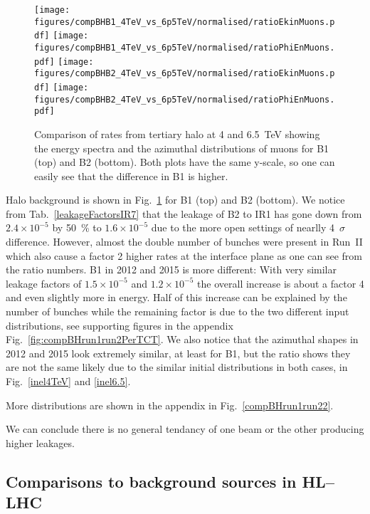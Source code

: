 \begin{figure}
\centering
  \texttt{[image: figures/compBHB1\_4TeV\_vs\_6p5TeV/normalised/ratioEkinMuons.pdf]}
  \texttt{[image: figures/compBHB1\_4TeV\_vs\_6p5TeV/normalised/ratioPhiEnMuons.pdf]}
  \texttt{[image: figures/compBHB2\_4TeV\_vs\_6p5TeV/normalised/ratioEkinMuons.pdf]}
  \texttt{[image: figures/compBHB2\_4TeV\_vs\_6p5TeV/normalised/ratioPhiEnMuons.pdf]}
 \caption{Comparison of rates from tertiary halo at 4 and 6.5~TeV showing the energy spectra and the azimuthal distributions of muons for B1 (top) and B2 (bottom). Both plots have the same y-scale, so one can easily see that the difference in B1 is higher.
  \label{fig:compBHrun1run2}}
\end{figure}

Halo background is shown in Fig.~\ref{fig:compBHrun1run2} for B1 (top) and B2 (bottom). We notice from Tab.~\ref{leakageFactorsIR7} that the leakage of B2 to IR1 has gone down from $2.4 \times 10^{-5}$ by 50~\% to $1.6 \times 10^{-5}$ due to the more open settings of nearlly 4~$\sigma$ difference. However, almost the double number of bunches were present in Run~II which also cause a factor 2 higher rates at the interface plane as one can see from the ratio numbers. B1 in 2012 and 2015 is more different: With very similar leakage factors of $1.5 \times 10^{-5}$ and $1.2 \times 10^{-5}$ the overall increase is about a factor 4 and even slightly more in energy. Half of this increase can be explained by the number of bunches while the remaining factor is due to the two different input distributions, see supporting figures in the appendix Fig.~\ref{fig:compBHrun1run2PerTCT}. We also notice that the azimuthal shapes in 2012 and 2015 look extremely similar, at least for B1, but the ratio shows they are not the same likely due to the similar initial distributions in both cases, in Fig.~\ref{inel4TeV} and \ref{inel6.5}.

More distributions are shown in the appendix in Fig.~\ref{compBHrun1run22}.

We can conclude there is no general tendancy of one beam or the other producing higher leakages. 

\subsection{Comparisons to background sources in HL--LHC}


